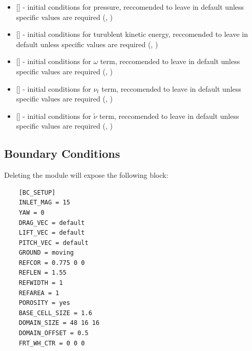 \begin{itemize}
    \item {} [] - initial conditions for pressure, reccomended to leave in default unless specific values are required (, )
    
    \item {} [] - initial conditions for turublent kinetic energy, reccomended to leave in default unless specific values are required (, )
    
    \item {} [] - initial conditions for \(\omega\) term, reccomended to leave in default unless specific values are required (, )
    
    \item {} [] - initial conditions for \(\nu_t\) term, reccomended to leave in default unless specific values are required (, )
    
    \item {} [] - initial conditions for \(\tilde{\nu}\) term, reccomended to leave in default unless specific values are required (, )
\end{itemize}

\subsection{Boundary Conditions}
Deleting the module  will expose the following block:
\begin{lstlisting}
    [BC_SETUP]
    INLET_MAG = 15
    YAW = 0
    DRAG_VEC = default
    LIFT_VEC = default
    PITCH_VEC = default
    GROUND = moving
    REFCOR = 0.775 0 0
    REFLEN = 1.55
    REFWIDTH = 1
    REFAREA = 1
    POROSITY = yes
    BASE_CELL_SIZE = 1.6
    DOMAIN_SIZE = 48 16 16
    DOMAIN_OFFSET = 0.5
    FRT_WH_CTR = 0 0 0
\end{lstlisting}

